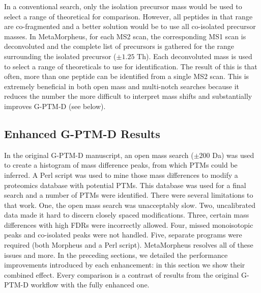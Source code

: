 \documentclass[journal=jprobs,manuscript=article]{achemso}
\begin{document}
In a conventional search, only the isolation precursor mass would be used to select a range of theoretical for comparison.
However, all peptides in that range are co-fragmented and a better solution would be to use all co-isolated precursor masses.
In MetaMorpheus, for each MS2 scan, the corresponding MS1 scan is deconvoluted and the complete list of precursors is gathered for the range surrounding the isolated precursor ($\pm 1.25$ Th).
Each deconvoluted mass is used to select a range of theoreticals to use for identification.
The result of this is that often, more than one peptide can be identified from a single MS2 scan.
This is extremely beneficial in both open mass and multi-notch searches because it reduces the number the more difficult to interpret mass shifts and substantially improves G-PTM-D (see below).



\subsection{Enhanced G-PTM-D Results}

In the original G-PTM-D manuscript, an open mass search ($\pm 200$ Da) was used to create a histogram of mass difference peaks, from which PTMs could be inferred.
A Perl script was used to mine those mass differences to modify a proteomics database with potential PTMs.
This database was used for a final search and a number of PTMs were identified.
There were several limitations to that work.
One, the open mass search was unacceptably slow.
Two, uncalibrated data made it hard to discern closely spaced modifications.
Three, certain mass differences with high FDRs were incorrectly allowed.
Four, missed monoisotopic peaks and co-isolated peaks were not handled.
Five, separate programs were required (both Morpheus and a Perl script).
MetaMorpheus resolves all of these issues and more.
In the preceding sections, we detailed the performance improvements introduced by each enhancement: in this section we show their combined effect.
Every comparison is a contrast of results from the original G-PTM-D workflow with the fully enhanced one.
\end{document}
